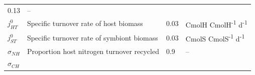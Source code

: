 \documentclass[]{elsarticle} %
\begin{document}
\begin{longtable}[c]{@{}llll@{}}
\begin{minipage}[t]{0.09\columnwidth}
0.13
\strut\end{minipage} &
\begin{minipage}[t]{0.23\columnwidth}\raggedright\strut
--
\strut\end{minipage}\tabularnewline
\begin{minipage}[t]{0.10\columnwidth}\raggedright\strut
\(j_{HT}^0\)
\strut\end{minipage} &
\begin{minipage}[t]{0.48\columnwidth}\raggedright\strut
Specific turnover rate of host biomass
\strut\end{minipage} &
\begin{minipage}[t]{0.09\columnwidth}\raggedright\strut
0.03
\strut\end{minipage} &
\begin{minipage}[t]{0.23\columnwidth}\raggedright\strut
CmolH CmolH\textsuperscript{-1} d\textsuperscript{-1}
\strut\end{minipage}\tabularnewline
\begin{minipage}[t]{0.10\columnwidth}\raggedright\strut
\(j_{ST}^0\)
\strut\end{minipage} &
\begin{minipage}[t]{0.48\columnwidth}\raggedright\strut
Specific turnover rate of symbiont biomass
\strut\end{minipage} &
\begin{minipage}[t]{0.09\columnwidth}\raggedright\strut
0.03
\strut\end{minipage} &
\begin{minipage}[t]{0.23\columnwidth}\raggedright\strut
CmolS CmolS\textsuperscript{-1} d\textsuperscript{-1}
\strut\end{minipage}\tabularnewline
\begin{minipage}[t]{0.10\columnwidth}\raggedright\strut
\(\sigma_{NH}\)
\strut\end{minipage} &
\begin{minipage}[t]{0.48\columnwidth}\raggedright\strut
Proportion host nitrogen turnover recycled
\strut\end{minipage} &
\begin{minipage}[t]{0.09\columnwidth}\raggedright\strut
0.9
\strut\end{minipage} &
\begin{minipage}[t]{0.23\columnwidth}\raggedright\strut
--
\strut\end{minipage}\tabularnewline
\begin{minipage}[t]{0.10\columnwidth}\raggedright\strut
\(\sigma_{CH}\)
\strut\end{minipage} &

\end{longtable}
\end{document}
